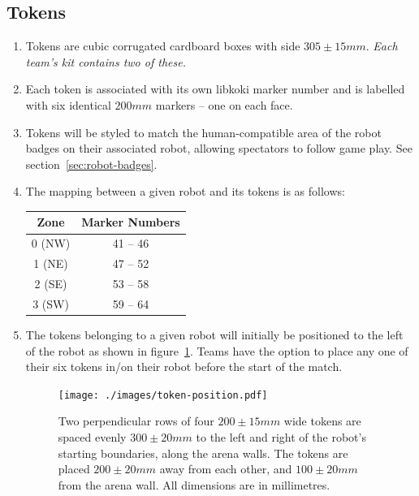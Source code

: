 \subsection{Tokens}
\label{sub:Tokens}
\begin{enumerate}
\item Tokens are cubic corrugated cardboard boxes with side $305 \pm 15 mm$.
      \emph{Each team's kit contains two of these.}

\item Each token is associated with its own libkoki marker number and is labelled with six identical $200mm$ markers -- one on each face.

\item Tokens will be styled to match the human-compatible area of the robot badges on their associated robot, allowing spectators to follow game play.
      See section~\ref{sec:robot-badges}.

\item The mapping between a given robot and its tokens is as follows:

\begin{center}
  \begin{tabular}{cc}
    \toprule
    \textbf{Zone} & \textbf{Marker Numbers} \\
    \midrule
    0 (NW) & 41 -- 46 \\
    1 (NE) & 47 -- 52 \\
    2 (SE) & 53 -- 58 \\
    3 (SW) & 59 -- 64 \\
    \bottomrule
  \end{tabular}
\end{center}

\item The tokens belonging to a given robot will initially be positioned to the left of the robot as shown in figure~\ref{fig:token-position}.
      Teams have the option to place any one of their six tokens in/on their robot before the start of the match.

\begin{figure}
  \centering
  \texttt{[image: ./images/token-position.pdf]}
  \caption{Two perpendicular rows of four $200 \pm 15mm$ wide tokens are spaced evenly $300 \pm 20mm$ to the left and right of the robot's starting boundaries, along the arena walls.
    The tokens are placed $200 \pm 20mm$ away from each other, and $100 \pm 20mm$ from the arena wall.
           All dimensions are in millimetres.}
  \label{fig:token-position}
\end{figure}

\end{enumerate}

\clearpage
